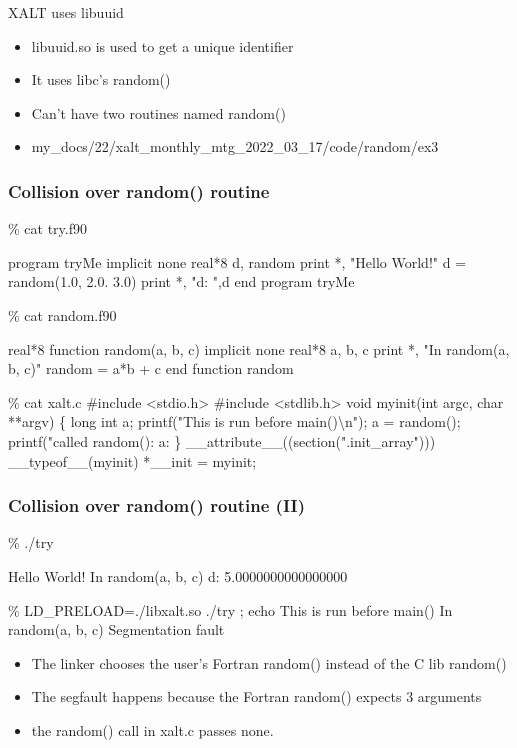\documentclass{beamer}
\begin{document}
\begin{frame}{XALT uses libuuid}
  \begin{itemize}
    \item libuuid.so is used to get a unique identifier
    \item It uses libc's random()
    \item Can't have two routines named random() 
    \item my\_docs/22/xalt\_monthly\_mtg\_2022\_03\_17/code/random/ex3


  \end{itemize}
\end{frame}

\begin{frame}[fragile]
    \frametitle{Collision over random() routine}
 {\tiny
    \begin{semiverbatim}
\% cat try.f90

program tryMe
   implicit none 
   real*8 d, random
   print *, "Hello World!"
   d = {\color{blue}{}random(1.0, 2.0. 3.0)}
   print *, "d: ",d
end program tryMe

\% cat random.f90

real*8 function {\color{blue}{}random(a, b, c)}
   implicit none
   real*8 a, b, c
   print *, "In random(a, b, c)"
   random = a*b + c
end function random

\% cat xalt.c
#include <stdio.h>
#include <stdlib.h>
void myinit(int argc, char **argv)
\{
  long int a;
  printf("This is run before main()\textbackslash{}n");
  a = {\color{red}{}random()};
  printf("called random(): a: %
\}
__attribute__((section(".init_array"))) __typeof__(myinit) *__init = myinit;

\end{semiverbatim}
}
\end{frame}

\begin{frame}[fragile]
    \frametitle{Collision over random() routine (II)}
 {\tiny
    \begin{semiverbatim}
\% ./try

 Hello World!
 In random(a, b, c)
 d:    5.0000000000000000     

\% LD_PRELOAD=./libxalt.so  ./try  ; echo
This is run before main()
 In random(a, b, c)
Segmentation fault
    \end{semiverbatim}
}
  \begin{itemize}
    \item The linker chooses the user's Fortran random() instead of the C lib
      random()
    \item The segfault happens because the Fortran random() expects 3
      arguments
    \item the random() call in xalt.c passes none.
  \end{itemize}

\end{frame}
\end{document}
